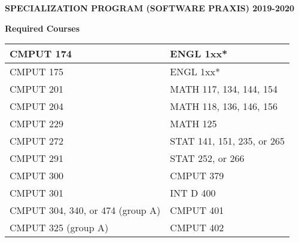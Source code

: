 \documentclass[12pt]{article}
\begin{document}
\begin{center}
    \textbf{SPECIALIZATION PROGRAM (SOFTWARE PRAXIS) 2019-2020}
\end{center}
\textbf{Required Courses}
\begin{center}
\begin{tabular}{| l | l | }
  \hline
 CMPUT 174\qquad\qquad\qquad\qquad \hfill\raisebox{-3px}{\CheckBox[height=.25in,width=.25in, name=c]{}} & ENGL 1xx* \qquad\qquad\qquad\qquad\qquad\hfill\raisebox{-3px}{\CheckBox[height=.25in,width=.25in, name=d]{}}\\ 
  \hline
 CMPUT 175 \hfill\raisebox{-3px}{\CheckBox[height=0.25in,width=0.25in, name=a]{}}& ENGL 1xx* \hfill\raisebox{-3px}{\CheckBox[width=0.25in,height=0.25in, name=b]{}}\\
  \hline
 CMPUT 201 \hfill\raisebox{-3px}{\CheckBox[height=0.25in,width=0.25in, name=1]{}}& MATH 117, 134, 144, 154 \hfill\raisebox{-3px}{\CheckBox[height=0.25in,width=0.25in, name=2]{}}\\
  \hline
 CMPUT 204 \hfill\raisebox{-3px}{\CheckBox[height=0.25in,width=0.25in, name=3]{}}& MATH 118, 136, 146, 156\hfill\raisebox{-3px}{\CheckBox[height=0.25in,width=0.25in, name=4]{}}\\
  \hline
 CMPUT 229 \hfill\raisebox{-3px}{\CheckBox[height=0.25in,width=0.25in, name=5]{}}& MATH 125\hfill\raisebox{-3px}{\CheckBox[height=0.25in,width=0.25in, name=6]{}}\\
  \hline
 CMPUT 272 \hfill\raisebox{-3px}{\CheckBox[height=0.25in,width=0.25in, name=fd]{}}& STAT 141, 151, 235, or 265\hfill\raisebox{-3px}{\CheckBox[height=0.25in,width=0.25in, name=ask]{}}\\
  \hline
 CMPUT 291 \hfill\raisebox{-3px}{\CheckBox[height=0.25in,width=0.25in, name=7]{}}& STAT 252, or 266\hfill\raisebox{-3px}{\CheckBox[height=0.25in,width=0.25in, name=8]{}}\\
  \hline
 CMPUT 300 \hfill\raisebox{-3px}{\CheckBox[height=0.25in,width=0.25in, name=9]{}}& CMPUT 379\hfill\raisebox{-3px}{\CheckBox[height=0.25in,width=0.25in, name=0]{}}\\
  \hline
 CMPUT 301 \hfill\raisebox{-3px}{\CheckBox[height=0.25in,width=0.25in, name=e]{}}& INT D 400\hfill\raisebox{-3px}{\CheckBox[height=0.25in,width=0.25in, name=f]{}}\\
  \hline
 CMPUT 304, 340, or 474 (group A) \hfill\raisebox{-3px}{\CheckBox[height=0.25in,width=0.25in, name=g]{}}& CMPUT 401\hfill\raisebox{-3px}{\CheckBox[height=0.25in,width=0.25in, name=h]{}}\\
  \hline 
  CMPUT 325 (group A) \hfill\raisebox{-3px}{\CheckBox[height=0.25in,width=0.25in, name=i]{}}& CMPUT 402 \hfill\raisebox{-3px}{\CheckBox[height=0.25in,width=0.25in, name=j]{}}\\
  \hline
\end{tabular}
\end{center}
\end{document}
